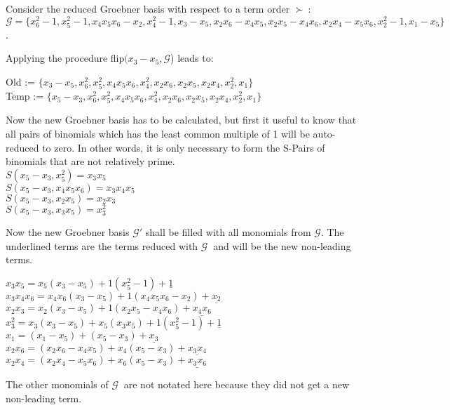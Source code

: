\begin{env_example}\normalfont
Consider the reduced Groebner basis with respect to a term order $\succ~$: $\mathcal{G}= \{x_{6}^{2}-1,x_{5}^{2}-1, x_{4}x_{5}x_{6} -x_{2},x_{4}^{2}-1,x_{3}-x_{5},x_{2}x_{6}-x_{4}x_{5},x_{2}x_{5}-x_{4}x_{6},x_{2}x_{4}-x_{5}x_{6},x_{2}^{2}-1,x_{1}-x_{5}  \} $.

Applying the procedure flip$(x_{3}-x_{5}, \mathcal{G}$) leads to:

Old := $\{x_{3}-x_{5},x_{6}^{2},x_{5}^{2}, x_{4}x_{5}x_{6} ,x_{4}^{2},x_{2}x_{6},x_{2}x_{5},x_{2}x_{4},x_{2}^{2},x_{1} \} $ \\
Temp := $\{x_{5}-x_{3},x_{6}^{2},x_{5}^{2}, x_{4}x_{5}x_{6} ,x_{4}^{2},x_{2}x_{6},x_{2}x_{5},x_{2}x_{4},x_{2}^{2},x_{1} \} $

Now the new Groebner basis has to be calculated, but first it useful to know that all pairs of binomials which has the least common multiple of 1 will be auto-reduced to zero. In other words, it is only necessary to form the S-Pairs of binomials that are not relatively prime.\\
$S(x_{5}-x_{3},x_{5}^{2}) = x_{3}x_{5}$ \\
$S(x_{5}-x_{3},x_{4}x_{5}x_{6}) = x_{3}x_{4}x_{5}$ \\
$S(x_{5}-x_{3},x_{2}x_{5}) = x_{2}x_{3}$\\
$S(x_{5}-x_{3},x_{3}x_{5}) = x_{3}^{2}$

Now the new Groebner basis $\mathcal{G}'$ shall be filled with all monomials from $\mathcal{G}$.
The underlined terms are the terms reduced with $\mathcal{G}~$ and will be the new non-leading terms.

$x_{3}x_{5} = x_{5}(x_{3}-x_{5}) + 1(x_{5}^{2}-1) + \underline{1}$\\
$x_{3}x_{4}x_{6} = x_{4}x_{6}(x_{3}-x_{5}) + 1(x_{4}x_{5}x_{6}-x_{2}) + \underline{x_{2}}$\\
$x_{2}x_{3} = x_{2}(x_{3}-x_{5}) + 1(x_{2}x_{5}- x_{4}x_{6}) + \underline{x_{4}x_{6}}$\\
$x_{3}^{2} = x_{3}(x_{3}-x_{5}) + x_{5}(x_{3}x_{5}) + 1(x_{5}^{2}-1)+\underline{1}$\\
$x_{1} = (x_{1}-x_{5}) + (x_{5}-x_{3}) +\underline{ x_{3}} $ \\
$x_{2}x_{6} = (x_{2}x_{6}-x_{4}x_{5}) + x_{4}(x_{5}-x_{3}) +\underline{ x_{3}x_{4}} $\\
$x_{2}x_{4} = (x_{2}x_{4}-x_{5}x_{6})+ x_{6}(x_{5}-x_{3}) +\underline{x_{3}x_{6}} $

The other monomials of $\mathcal{G}~$ are not notated here because they did not get a new non-leading term.


\end{env_example}
